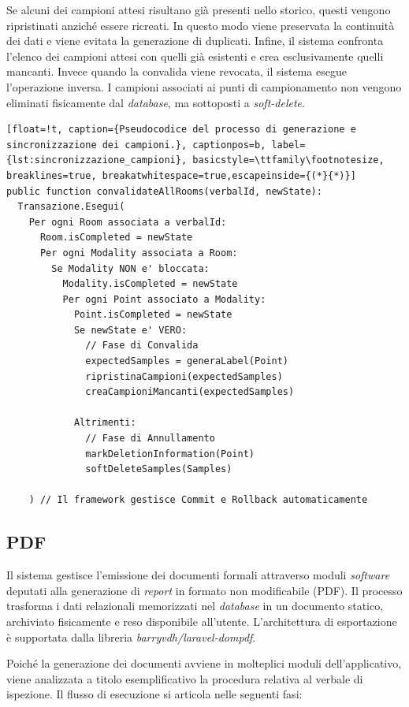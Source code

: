 Se alcuni dei campioni attesi risultano già presenti nello storico, questi vengono ripristinati anziché essere ricreati. In questo modo viene preservata la continuità dei dati e viene evitata la generazione di duplicati. Infine, il sistema confronta l'elenco dei campioni attesi con quelli già esistenti e crea esclusivamente quelli mancanti. Invece quando la convalida viene revocata, il sistema esegue l'operazione inversa. I campioni associati ai punti di campionamento non vengono eliminati fisicamente dal \textit{database}, ma sottoposti a \textit{soft-delete}.
\begin{lstlisting}[float=!t, caption={Pseudocodice del processo di generazione e sincronizzazione dei campioni.}, captionpos=b, label={lst:sincronizzazione_campioni}, basicstyle=\ttfamily\footnotesize, breaklines=true, breakatwhitespace=true,escapeinside={(*}{*)}]
public function convalidateAllRooms(verbalId, newState):
  Transazione.Esegui(
	Per ogni Room associata a verbalId:
	  Room.isCompleted = newState
	  Per ogni Modality associata a Room:
		Se Modality NON e' bloccata:
		  Modality.isCompleted = newState
		  Per ogni Point associato a Modality:
		    Point.isCompleted = newState
			Se newState e' VERO:
			  // Fase di Convalida
			  expectedSamples = generaLabel(Point)
			  ripristinaCampioni(expectedSamples)
			  creaCampioniMancanti(expectedSamples)
					
			Altrimenti:
			  // Fase di Annullamento		
			  markDeletionInformation(Point)
			  softDeleteSamples(Samples)
				
	) // Il framework gestisce Commit e Rollback automaticamente
\end{lstlisting}
\subsection{PDF}
Il sistema gestisce l'emissione dei documenti formali attraverso moduli \textit{software} deputati alla generazione di \textit{report} in formato non modificabile (PDF). Il processo trasforma i dati relazionali memorizzati nel \textit{database} in un documento statico, archiviato fisicamente e reso disponibile all'utente. L'architettura di esportazione è supportata dalla libreria \textit{barryvdh/laravel-dompdf}.

Poiché la generazione dei documenti avviene in molteplici moduli dell'applicativo, viene analizzata a titolo esemplificativo la procedura relativa al verbale di ispezione. Il flusso di esecuzione si articola nelle seguenti fasi:

